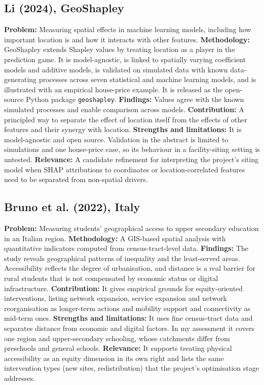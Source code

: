 \documentclass[pdflatex,sn-mathphys-num]{sn-jnl}
\begin{document}
\subsection{Li (2024), GeoShapley \cite{li2024}}
\textbf{Problem:} Measuring spatial effects in machine learning models, including how important location is and how it interacts with other features.
\textbf{Methodology:} GeoShapley extends Shapley values by treating location as a player in the prediction game. It is model-agnostic, is linked to spatially varying coefficient models and additive models, is validated on simulated data with known data-generating processes across seven statistical and machine learning models, and is illustrated with an empirical house-price example. It is released as the open-source Python package \texttt{geoshapley}.
\textbf{Findings:} Values agree with the known simulated processes and enable comparison across models.
\textbf{Contribution:} A principled way to separate the effect of location itself from the effects of other features and their synergy with location.
\textbf{Strengths and limitations:} It is model-agnostic and open source. Validation in the abstract is limited to simulations and one house-price case, so its behaviour in a facility-siting setting is untested.
\textbf{Relevance:} A candidate refinement for interpreting the project's siting model when SHAP attributions to coordinates or location-correlated features need to be separated from non-spatial drivers.

\subsection{Bruno et al. (2022), Italy \cite{italy2022}}
\textbf{Problem:} Measuring students' geographical access to upper secondary education in an Italian region.
\textbf{Methodology:} A GIS-based spatial analysis with quantitative indicators computed from census-tract-level data.
\textbf{Findings:} The study reveals geographical patterns of inequality and the least-served areas. Accessibility reflects the degree of urbanisation, and distance is a real barrier for rural students that is not compensated by economic status or digital infrastructure.
\textbf{Contribution:} It gives empirical grounds for equity-oriented interventions, listing network expansion, service expansion and network reorganisation as longer-term actions and mobility support and connectivity as mid-term ones.
\textbf{Strengths and limitations:} It uses fine census-tract data and separates distance from economic and digital factors. In my assessment it covers one region and upper-secondary schooling, whose catchments differ from preschools and general schools.
\textbf{Relevance:} It supports treating physical accessibility as an equity dimension in its own right and lists the same intervention types (new sites, redistribution) that the project's optimisation stage addresses.
\end{document}
